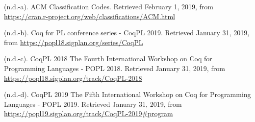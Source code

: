 \documentclass[12pt,twoside]{article}
\begin{document}
{\begin{thebibliography}{222}
\mdbibitemlabel{}(n.d.-a). ACM Classification Codes. Retrieved February 1, 2019, from \href{https://cran.r-project.org/web/classifications/ACM.html}{{\ttfamily https://\hspace{0pt}cran.\hspace{0pt}r-\hspace{0pt}project.\hspace{0pt}org/\hspace{0pt}web/\hspace{0pt}classifications/\hspace{0pt}ACM.\hspace{0pt}html}}\label{acm_acm_nodate}%

\mdbibitemlabel{}(n.d.-b). Coq for PL conference series - CoqPL 2019. Retrieved January 31, 2019, from \href{https://popl18.sigplan.org/series/CoqPL}{{\ttfamily https://\hspace{0pt}popl18.\hspace{0pt}sigplan.\hspace{0pt}org/\hspace{0pt}series/\hspace{0pt}CoqPL}}\label{acm_coq_nodate}%

\mdbibitemlabel{}(n.d.-c). CoqPL 2018 The Fourth International Workshop on Coq for Programming Languages - POPL 2018. Retrieved January 31, 2019, from \href{https://popl18.sigplan.org/track/CoqPL-2018}{{\ttfamily https://\hspace{0pt}popl18.\hspace{0pt}sigplan.\hspace{0pt}org/\hspace{0pt}track/\hspace{0pt}CoqPL-\hspace{0pt}2018}}\label{acm_coqpl_nodate-1}%

\mdbibitemlabel{}(n.d.-d). CoqPL 2019 The Fifth International Workshop on Coq for Programming Languages - POPL 2019. Retrieved January 31, 2019, from \href{https://popl19.sigplan.org/track/CoqPL-2019\%23program}{{\ttfamily https://\hspace{0pt}popl19.\hspace{0pt}sigplan.\hspace{0pt}org/\hspace{0pt}track/\hspace{0pt}CoqPL-\hspace{0pt}2019\#\hspace{0pt}program}}\label{acm_coqpl_nodate}%


\end{thebibliography}}
\end{document}
